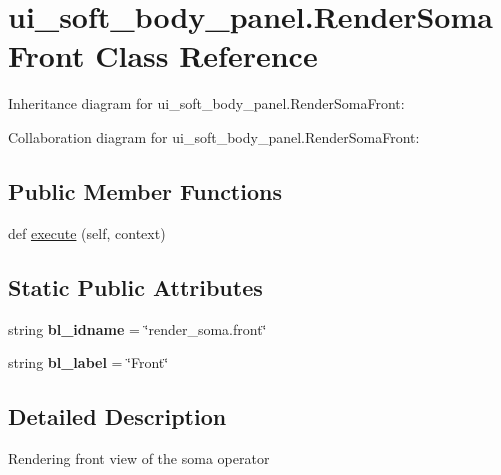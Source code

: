 \hypertarget{classui__soft__body__panel_1_1RenderSomaFront}{}\section{ui\+\_\+soft\+\_\+body\+\_\+panel.\+Render\+Soma\+Front Class Reference}
\label{classui__soft__body__panel_1_1RenderSomaFront}


Inheritance diagram for ui\+\_\+soft\+\_\+body\+\_\+panel.\+Render\+Soma\+Front\+:


Collaboration diagram for ui\+\_\+soft\+\_\+body\+\_\+panel.\+Render\+Soma\+Front\+:
\subsection*{Public Member Functions}
\begin{DoxyCompactItemize}
\item 
def \hyperlink{classui__soft__body__panel_1_1RenderSomaFront_ab60cb62f239af0cb8ddbf220398db438}{execute} (self, context)
\end{DoxyCompactItemize}
\subsection*{Static Public Attributes}
\begin{DoxyCompactItemize}
\item 
string {\bfseries bl\+\_\+idname} = \char`\"{}render\+\_\+soma.\+front\char`\"{}\hypertarget{classui__soft__body__panel_1_1RenderSomaFront_a00a62cf0827af62c7941a830faefa519}{}\label{classui__soft__body__panel_1_1RenderSomaFront_a00a62cf0827af62c7941a830faefa519}

\item 
string {\bfseries bl\+\_\+label} = \char`\"{}Front\char`\"{}\hypertarget{classui__soft__body__panel_1_1RenderSomaFront_ac804bf816fbd1b38a6d2cb2cd4deec23}{}\label{classui__soft__body__panel_1_1RenderSomaFront_ac804bf816fbd1b38a6d2cb2cd4deec23}

\end{DoxyCompactItemize}


\subsection{Detailed Description}
\begin{DoxyVerb}Rendering front view of the soma operator\end{DoxyVerb}
 

